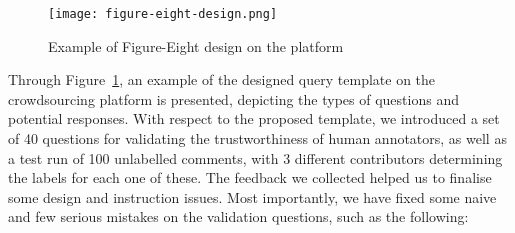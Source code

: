 \documentclass[sigconf]{acmart}
\begin{document}
\iffalse
The types of HS are as follows:
\begin{itemize}
    \item \textit{Gender}: When a comment is targeting gender (ex. All men should die).
    \item \textit{Race}: When a comment is targeting a specific race (ex. Black people are apes).
    \item \textit{National Origin}: When a comment is targeting a specific nation (ex. Chinese people should be deported).
    \item \textit{Disability}: When a comment contains HS about one of these disability categories:
        \begin{itemize}
        \item Autism Spectrum Disorder
        \item Deaf-blindness
        \item Developmental Delay
        \item Hearing Impairment, Including Deafness
        \item Infant/Toddler with a Disability
        \item Intellectual Disability
        \item Orthopaedic Impairment
        \item Specific Learning Disability (SLD)
        \item Serious Emotional Disability
        \item Speech or Language Impairment
        \item Traumatic Brain Injury (TBI)
        \end{itemize}
    \item \textit{Religion}: When a comment is targeting a specific religion (ex. Christians are true devils, we should get rid of them).
    \item \textit{Sexual Orientation}: When a comment is targeting a specific sexual preference (ex. I hate gay people).
\end{itemize}{}
\fi
\begin{figure}[ht]
\centering
\texttt{[image: figure-eight-design.png]}
\caption{Example of Figure-Eight design on the platform}
\label{fig:figureEightExample}
\end{figure}

Through Figure~\ref{fig:figureEightExample}, an example of the designed query template on the crowdsourcing platform is presented, depicting the types of questions and potential responses. With respect to the proposed template, we introduced a set of 40 questions for validating the trustworthiness of human annotators, as well as a test run of 100 unlabelled comments, with 3 different contributors determining the labels for each one of these. The feedback we collected helped us to finalise some design and instruction issues. Most importantly, we have fixed some naive and few serious mistakes on the validation questions, such as the following:
\end{document}
